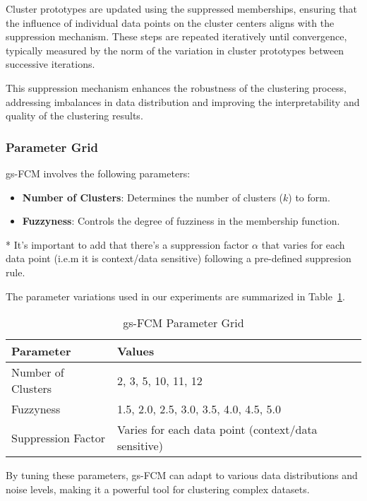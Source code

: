 Cluster prototypes are updated using the suppressed memberships, ensuring that the influence of individual data points on the cluster centers aligns with the suppression mechanism. These steps are repeated iteratively until convergence, typically measured by the norm of the variation in cluster prototypes between successive iterations.

This suppression mechanism enhances the robustness of the clustering process, addressing imbalances in data distribution and improving the interpretability and quality of the clustering results.


\subsubsection{Parameter Grid}
gs-FCM involves the following parameters:

\begin{itemize}
    \item \textbf{Number of Clusters}: Determines the number of clusters (\(k\)) to form.
    \item \textbf{Fuzzyness}: Controls the degree of fuzziness in the membership function.
\end{itemize}

* It's important to add that there's a suppression factor $\alpha$ that varies for each data point
(i.e.m it is context/data sensitive) following a pre-defined suppresion rule.

The parameter variations used in our experiments are summarized in Table~\ref{tab:gsfcm-param-grid}.

\begin{table}[h!]
\centering
\caption{gs-FCM Parameter Grid}
\label{tab:gsfcm-param-grid}
\begin{tabularx}{\columnwidth}{|X|X|}
\hline
\textbf{Parameter} & \textbf{Values} \\ \hline
Number of Clusters & 2, 3, 5, 10, 11, 12 \\ \hline
Fuzzyness & 1.5, 2.0, 2.5, 3.0, 3.5, 4.0, 4.5, 5.0 \\ \hline
Suppression Factor & Varies for each data point (context/data sensitive) \\ \hline
\end{tabularx}
\end{table}

By tuning these parameters, gs-FCM can adapt to various data distributions and noise levels, making it a powerful tool for clustering complex datasets.